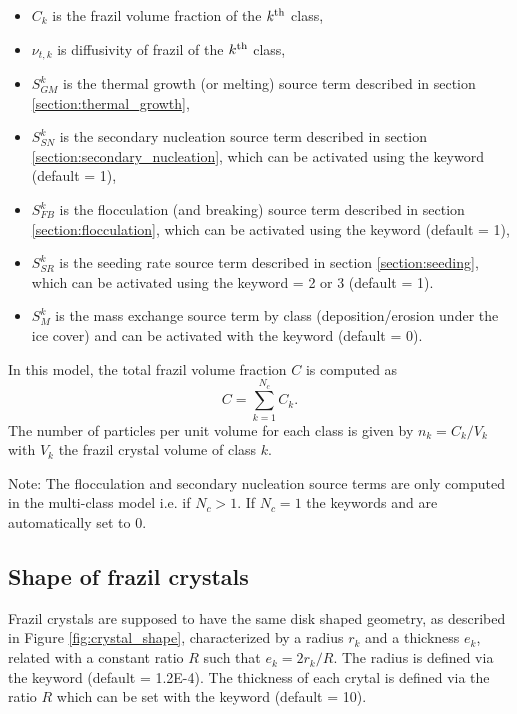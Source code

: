 \begin{itemize}
	\item $C_k$ is the frazil volume fraction of the $k^{\rm{th}}$ class,
	\item $\nu_{t,k}$ is diffusivity of frazil of the $k^{\rm{th}}$ class,
	\item $S^k_{GM}$ is the thermal growth (or melting) source term described in section \ref{section:thermal_growth},
	\item $S^k_{SN}$ is the secondary nucleation source term described in section \ref{section:secondary_nucleation}, which can be activated using the keyword  (default = 1),
	\item $S^k_{FB}$ is the flocculation (and breaking) source term described in section \ref{section:flocculation}, which can be activated using the keyword  (default = 1),
	\item $S^k_{SR}$ is the seeding rate source term described in section \ref{section:seeding}, which can be activated using the keyword  = 2 or 3 (default = 1).
  \item $S_M^k$ is the mass exchange source term by class (deposition/erosion under the ice cover) and can be activated with the keyword  (default = 0).
\end{itemize}
In this model, the total frazil volume fraction $C$ is computed as
\begin{equation}
C = \sum_{k=1}^{N_c} C_k.
\end{equation}
The number of particles per unit volume for each class is given by $n_k=C_k/V_k$ with $V_k$ the frazil crystal volume of class $k$.

\begin{WarningBlock}{Note:}
    The flocculation and secondary nucleation source terms are only computed in the multi-class model
    i.e. if $N_c > 1$. If $N_c = 1$
    the keywords  and 
    are automatically set to $0$.
\end{WarningBlock}

\subsection{Shape of frazil crystals}
Frazil crystals are supposed to have the same disk shaped geometry, as described in Figure \ref{fig:crystal_shape}, characterized by a radius $r_k$ and a thickness $e_k$, related with a constant ratio $R$ such that $e_k = 2r_k/R$.
The radius is defined via the keyword  (default = 1.2E-4).
The thickness of each crytal is defined via the ratio $R$
which can be set with the keyword  (default = 10).

